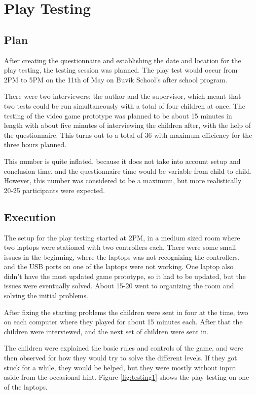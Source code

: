 \chapter{Play Testing}
\section{Plan}
After creating the questionnaire and establishing the date and location for the play testing, the testing session was planned. The play test would occur from 2PM to 5PM on the 11th of May on Buvik School's after school program. 

There were two interviewers: the author and the supervisor, which meant that two tests could be run simultaneously with a total of four children at once. The testing of the video game prototype was planned to be about 15 minutes in length with about five minutes of interviewing the children after, with the help of the questionnaire. This turns out to a total of 36 with maximum efficiency for the three hours planned. 

This number is quite inflated, because it does not take into account setup and conclusion time, and the questionnaire time would be variable from child to child. However, this number was considered to be a maximum, but more realistically 20-25 participants were expected.


\section{Execution}
The setup for the play testing started at 2PM, in a medium sized room where two laptops were stationed with two controllers each. There were some small issues in the beginning, where the laptops was not recognizing the controllers, and the USB ports on one of the laptops were not working. One laptop also didn't have the most updated game prototype, so it had to be updated, but the issues were eventually solved. About 15-20 went to organizing the room and solving the initial problems.

After fixing the starting problems the children were sent in four at the time, two on each computer where they played for about 15 minutes each. After that the children were interviewed, and the next set of children were sent in.

The children were explained the basic rules and controls of the game, and were then observed for how they would try to solve the different levels. If they got stuck for a while, they would be helped, but they were mostly without input aside from the occasional hint. Figure \ref{fig:testing1} shows the play testing on one of the laptops.

